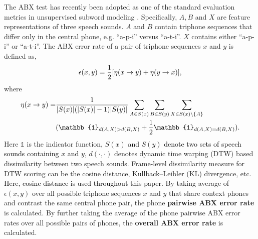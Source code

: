 \documentclass[transmag]{IEEEtran}
\begin{document}
The ABX test has recently been adopted as one of the standard evaluation metrics in unsupervised subword modeling  \cite{versteegh2015zero,dunbar2017zero,Dunbar2019}.
Specifically, $A, B$ and $X$ are feature representations of three speech sounds.  $A$ and $B$ contain triphone sequences that differ only in the central phone, e.g. ``a-p-i'' versus ``a-t-i''. $X$ contains either ``a-p-i'' or ``a-t-i''. 
The ABX error rate of a pair of triphone sequences $x$ and $y$ is defined as,
\begin{equation}
    \epsilon (x, y) = \frac{1}{2}[ \textcolor{black}{\eta(x \rightarrow y)} + \textcolor{black}{\eta (y \rightarrow x)}],
    \label{eqt:abx_error_rate_triphones}
\end{equation}
where 
\begin{equation}
\begin{split}
 \textcolor{black}{\eta(x \rightarrow y)} =& \frac{1}{\vert S(x) \vert (\vert S(x) \vert-1) \vert S(y) \vert} \sum_{A \in S(x)} \sum_{B \in S(y)}\sum_{X \in S(x) \backslash \{A\}} \\
 &(\mathbb{1}_{d(A,X) > d(B,X)} + \frac{1}{2} \mathbb{1}_{d(A,X) = d(B,X)}).
\end{split}
\label{eqt:abx_error_rate_triphone_asym}
\end{equation}
Here $\mathbb{1}$ is the indicator function, \textcolor{black}{$S(x)$ and $S(y)$ denote two sets of speech sounds containing $x$ and $y$}, $d(\cdot, \cdot)$ denotes dynamic time warping (DTW) based dissimilarity between two speech sounds. Frame-level dissimilarity measure for DTW scoring can be the cosine distance, Kullback–Leibler (KL) divergence, etc. 
\textcolor{black}{Here, cosine distance is used throughout this paper.}
By taking average of $\epsilon(x,y)$ over all possible triphone sequences $x$ and $y$ that share context phones and contrast the same central phone pair, the phone \textbf{pairwise ABX error rate} is calculated. By further taking the average of the phone pairwise ABX error rates over all possible pairs of phones, the \textbf{overall ABX error rate} is calculated.
\end{document}
